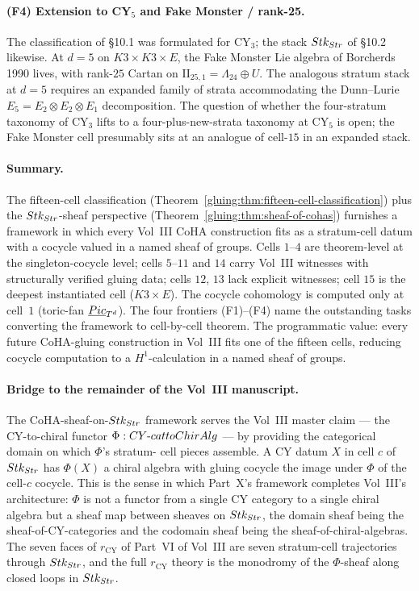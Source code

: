 \paragraph{(F4) Extension to CY$_{5}$ and Fake Monster / rank-25.}
The classification of \S 10.1 was formulated for CY$_{3}$; the stack
$Stk_{Str}$ of \S 10.2 likewise. At $d=5$ on $K3\times K3\times E$,
the Fake Monster Lie algebra of Borcherds 1990 lives, with rank-$25$
Cartan on $\mathrm{II}_{25,1}=\Lambda_{24}\oplus U$. The analogous
stratum stack at $d=5$ requires an expanded family of strata
accommodating the Dunn--Lurie $E_{5}=E_{2}\otimes E_{2}\otimes E_{1}$
decomposition. The question of whether the four-stratum taxonomy of
CY$_{3}$ lifts to a four-plus-new-strata taxonomy at CY$_{5}$ is
open; the Fake Monster cell presumably sits at an analogue of
cell-$15$ in an expanded stack.

\paragraph{Summary.} The fifteen-cell classification
(Theorem~\ref{gluing:thm:fifteen-cell-classification}) plus the
$Stk_{Str}$-sheaf perspective (Theorem~\ref{gluing:thm:sheaf-of-cohas})
furnishes a framework in which every Vol~III CoHA construction fits
as a stratum-cell datum with a cocycle valued in a named sheaf of
groups. Cells $1$--$4$ are theorem-level at the singleton-cocycle
level; cells $5$--$11$ and $14$ carry Vol~III witnesses with
structurally verified gluing data; cells $12$, $13$ lack explicit
witnesses; cell $15$ is the deepest instantiated cell
($K3\times E$). The cocycle cohomology is computed only at cell~$1$
(toric-fan $\underline{Pic}_{T^{d}}$). The four frontiers
(F1)--(F4) name the outstanding tasks converting the framework to
cell-by-cell theorem. The programmatic value: every future
CoHA-gluing construction in Vol~III fits one of the fifteen cells,
reducing cocycle computation to a $H^{1}$-calculation in a named
sheaf of groups.

\paragraph{Bridge to the remainder of the Vol~III manuscript.} The
CoHA-sheaf-on-$Stk_{Str}$ framework serves the Vol~III master
claim --- the CY-to-chiral functor $\Phi:CY\text{-}cattoChirAlg$
--- by providing the categorical domain on which $\Phi$'s stratum-
cell pieces assemble. A CY datum $X$ in cell $c$ of $Stk_{Str}$
has $\Phi(X)$ a chiral algebra with gluing cocycle the image under
$\Phi$ of the cell-$c$ cocycle. This is the sense in which Part~X's
framework completes Vol~III's architecture: $\Phi$ is not a functor
from a single CY category to a single chiral algebra but a sheaf map
between sheaves on $Stk_{Str}$, the domain sheaf being the
sheaf-of-CY-categories and the codomain sheaf being the
sheaf-of-chiral-algebras. The seven faces of $r_{\mathrm{CY}}$ of
Part~VI of Vol~III are seven stratum-cell trajectories through
$Stk_{Str}$, and the full $r_{\mathrm{CY}}$ theory is the monodromy
of the $\Phi$-sheaf along closed loops in $Stk_{Str}$.
